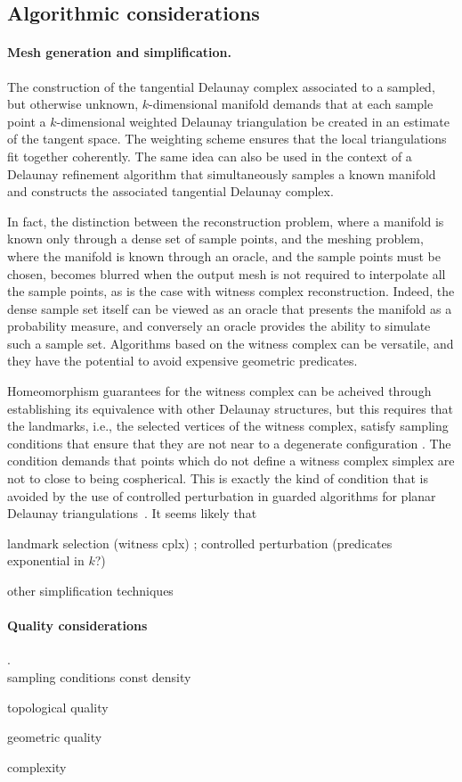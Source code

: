

\subsection*{Algorithmic considerations}

\paragraph{Mesh generation and simplification.}
The construction of the tangential Delaunay complex associated to a
sampled, but otherwise unknown, $k$-dimensional manifold demands that
at each sample point a $k$-dimensional weighted Delaunay triangulation
be created in an estimate of the tangent space. The weighting scheme
ensures that the local triangulations fit together coherently. The
same idea can also be used in the context of a Delaunay refinement
algorithm that simultaneously samples a known manifold and constructs
the associated tangential Delaunay complex. 

In fact, the distinction between the reconstruction problem, where a
manifold is known only through a dense set of sample points, and the
meshing problem, where the manifold is known through an oracle, and
the sample points must be chosen, becomes blurred when the output mesh
is not required to interpolate all the sample points, as is the case
with witness complex reconstruction. Indeed, the dense sample set
itself can be viewed as an oracle that presents the manifold as a
probability measure, and conversely an oracle provides the ability to
simulate such a sample set. Algorithms based on the witness complex
can be versatile, and they have the potential to avoid expensive
geometric predicates.

Homeomorphism guarantees for the witness complex can be acheived
through establishing its equivalence with other Delaunay structures,
but this requires that the landmarks, i.e., the selected vertices of
the witness complex, satisfy sampling conditions that ensure that they
are not near to a degenerate configuration
\cite{boissonnat2011cgl,boissonnat2012stab}.  The condition demands
that points which do not define a witness complex simplex are not to
close to being cospherical. This is exactly the kind of condition that
is avoided by the use of controlled perturbation in  guarded
algorithms for planar Delaunay triangulations~\cite{funke2005cp}. It
seems likely that





landmark selection (witness cplx) ;  controlled perturbation
(predicates exponential in $k$?)

other simplification techniques

\paragraph{Quality considerations} .\\

sampling conditions
const density

topological quality


geometric quality

complexity



